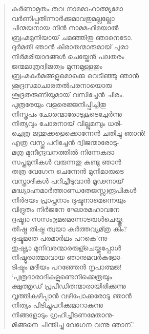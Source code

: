 \begin{verse}
കര്‍ണാമൃതം തവ നാമമാഹാത്മ്യമോ\\
വര്‍ണിപ്പതിന്നാര്‍ക്കുമാവതുമല്ലല്ലോ\\
ചിന്മയനായ നിന്‍ നാമമഹിമയാല്‍\\
ബ്രഹ്മമുനിയായ് ചമഞ്ഞിതു ഞാനെടോ.\\
ദുര്‍മതി ഞാന്‍ കിരാതന്മാരുമായ് പുരാ\\
നിര്‍മരിയാദങ്ങള്‍ ചെയ്തേന്‍ പലതരം\\
ജന്മമാത്രദ്വിജത്വം മുന്നമുള്ളതും\\
ബ്രഹ്മകര്‍മങ്ങളുമൊക്കെ വെടിഞ്ഞു ഞാന്‍\\
ശൂദ്രസമാചാരതല്‍പരനായൊരു\\
ശൂദ്രതരുണിയുമായ് വസിച്ചേന്‍ ചിരം.\\
പുത്രരേയും വളരെജ്ജനിപ്പിച്ചിതു\\
നിസ്ത്രപം ചോരന്മാരോടുകൂടെച്ചേര്‍ന്നു\\
നിത്യവും ചോരനായ് വില്ലുമമ്പും ധരി-\\
ച്ചെത്ര ജന്തുക്കളെക്കൊന്നേന്‍ ചതിച്ചു ഞാന്‍!\\
എത്ര വസ്തു പറിച്ചേന്‍ ദ്വിജന്മാരോടു-\\
മത്ര മുനീന്ദ്രവനത്തില്‍ നിന്നേകദാ\\
സപ്തമുനികള്‍ വരുന്നതു കണ്ടു ഞാന്‍\\
തത്ര വേഗേന ചെന്നേന്‍ മുനിമാരുടെ\\
വസ്ത്രാദികള്‍ പറിച്ചീടുവാന്‍ മൂഢനായ്\\
മദ്ധ്യാഹ്നമാര്‍ത്താണ്ഡതേജസ്സ്വരൂപികള്‍\\
നിര്‍ദയം പ്രാപ്തനാം ദുഷ്ടനാമെന്നെയും\\
വിദ്രുതം നിര്‍ജനേ ഘോരമഹാവനേ\\
ദൃഷ്ട്വാ സസംഭ്രമമെന്നോടരുള്‍ചെയ്തു:\\
തിഷ്ഠ തിഷ്ഠ ത്വയാ കര്‍ത്തവ്യമ്ത്ര കിം?\\
ദുഷ്ടമതേ പരമാര്‍ഥം പറകെ’ന്നു\\
തുഷ്ട്യാ മുനിവരന്മാരരുള്ചെയ്തപ്പോള്‍\\
നിഷ്ഠുരാത്മാവായ ഞാനുമവര്‍കളോ-\\
ടിഷ്ടം മദീയം പറഞ്ഞേന്‍ നൃപാത്മജ!\\
‘പുത്രദാരാദികളുണ്ടെനിക്കെത്രയും\\
ക്ഷുത്തൃഡ് പ്രപീഡിതന്മാരായിരിക്കുന്നു\\
വൃത്തികഴിപ്പാന്‍ വഴിപോക്കരോടു ഞാന്‍\\
നിത്യം പിടിച്ചുപറിക്കുമാറാകുന്നു\\
നിങ്ങളോടും ഗ്രഹിച്ചീടണമേതാനു-\\
മിങ്ങനെ ചിന്തിച്ചു വേഗേന വന്നു ഞാന്.‍’\\

\end{verse}
